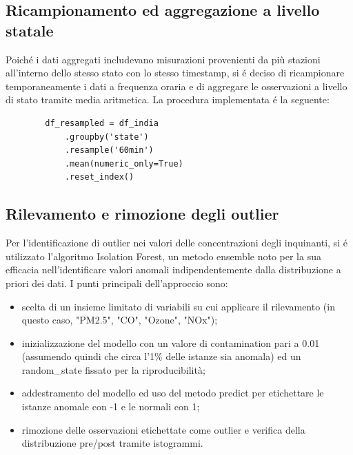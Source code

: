 \documentclass[a4paper,12pt]{report}
\begin{document}
	\subsection{Ricampionamento ed aggregazione a livello statale}
	Poiché i dati aggregati includevano misurazioni provenienti da più stazioni all'interno dello stesso stato con lo stesso timestamp, si é deciso di ricampionare temporaneamente i dati a frequenza oraria e di aggregare le osservazioni a livello di stato tramite media aritmetica. La procedura implementata é la seguente:
	
	\begin{verbatim}
		df_resampled = df_india
			.groupby('state')
			.resample('60min')
			.mean(numeric_only=True)
			.reset_index()
	\end{verbatim}
	
	\subsection{Rilevamento e rimozione degli outlier}
	Per l'identificazione di outlier nei valori delle concentrazioni degli inquinanti, si é utilizzato l'algoritmo Isolation Forest, un metodo ensemble noto per la sua efficacia nell'identificare valori anomali indipendentemente dalla distribuzione a priori dei dati. I punti principali dell'approccio sono:
	
	\begin{itemize}
		\item scelta di un insieme limitato di variabili su cui applicare il rilevamento (in questo caso, "PM2.5", "CO", "Ozone", "NOx");
		\item inizializzazione del modello con un valore di contamination pari a 0.01 (assumendo quindi che circa l'1\% delle istanze sia anomala) ed un random\_state fissato per la riproducibilità;
		\item addestramento del modello ed uso del metodo predict per etichettare le istanze anomale con -1 e le normali con 1;
		\item rimozione delle osservazioni etichettate come outlier e verifica della distribuzione pre/post tramite istogrammi.
	\end{itemize}
	
\end{document}
